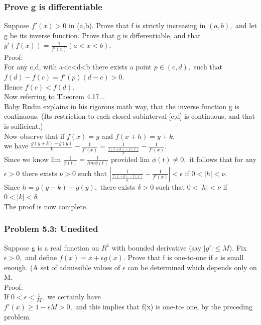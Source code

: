 \subsubsection*{Prove g is differentiable}
Suppose $f'(x)>0$ in (a,b). Prove that f is strictly increasing in $(a,b),$ and let g be its inverse function. Prove that g is differentiable, and that $g'(f(x))=\frac{1}{f'(x)} (a<x<b).$\\ 
Proof: \\ 
For any c,d, with a<c<d<b there exists a point $p \in (c,d),$ such that $f(d)-f(c)=f'(p)(d-c)>0.$\\ 
Hence $f(c)<f(d).$\\
Now referring to Theorem 4.17... \\

Baby Rudin explains in his rigorous math way, that the inverse function g is continuous. (Its restriction to each closed subinterval [c,d] is continuous, and that is sufficient.) \\ 
Now observe that if $f(x)=y$ and $f(x+h)=y+k,$ \\ 
we have $\frac{g(y+k)-g(y)}{k}-\frac{1}{f'(x)}=\frac{1}{\frac{f(x+h)-f(x)}{h}}-\frac{1}{f'(x)}.$\\ 
Since we know lim $\frac{1}{\phi(t)}=\frac{1}{lim \phi(t)}$ provided lim $\phi(t)\neq 0,$ it follows that for any $\epsilon >0$ there exists $\nu >0$ such that $|\frac{1}{\frac{f(x+h)-f(x)}{h}}-\frac{1}{f'(x)}|<\epsilon$ if $0<|h|<\nu.$ \\ 
Since $h=g(y+k)-g(y),$ there exists $\delta >0$ such that $0<|h|< \nu $ if $0<|k|<\delta.$ \\ 
The proof is now complete. \subsubsection*{Problem 5.3: Unedited }
Suppose g is a real function on $R^1$ with bounded derivative (say $|g'|\leq M).$ Fix $\epsilon >0,$ and define $f(x)=x+ \epsilon g(x).$ Prove that f is one-to-one if $\epsilon$ is small enough. (A set of admissible values of $\epsilon$ can be determined which depends only on M. \\ 

Proof: \\ 
If $0< \epsilon < \frac{1}{M},$ we certainly have \\ 
$f'(x) \geq 1 - \epsilon M >0,$ and this implies that f(x) is one-to- one, by the preceding problem. \\ 


